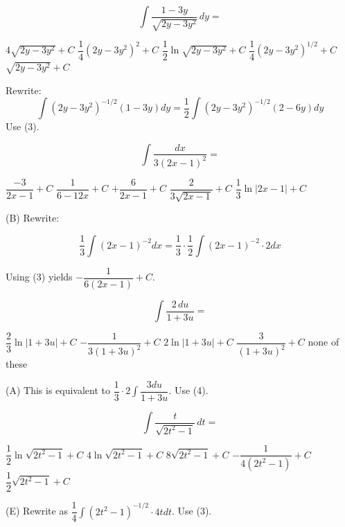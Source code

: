 \question
\[
\displaystyle\int \dfrac{1-3 y}{\sqrt{2 y-3 y^{2}}} \,dy=
\]
\begin{choices}
  \choice $4 \sqrt{2 y-3 y^{2}}+C$
  \choice $\dfrac{1}{4}\left(2 y-3 y^{2}\right)^{2}+C$
  \choice $\dfrac{1}{2} \ln \sqrt{2 y-3 y^{2}}+C$
  \choice $\dfrac{1}{4}\left(2 y-3 y^{2}\right)^{1 / 2}+C$
  \CorrectChoice $\sqrt{2 y-3 y^{2}}+C$
\end{choices}
\begin{solution}
Rewrite:
\[
\displaystyle\int\left(2 y-3 y^{2}\right)^{-1 / 2}(1-3 y) d y=\dfrac{1}{2} \displaystyle\int\left(2 y-3 y^{2}\right)^{-1 / 2}(2-6 y) d y
\]
Use (3).
\end{solution}






\newpage




\question
\[
\displaystyle\int \dfrac{d x}{3(2 x-1)^{2}}=
\]
\begin{choices}
  \choice $\dfrac{-3}{2 x-1}+C$
  \CorrectChoice $\dfrac{1}{6-12 x}+C$
  \choice $+\dfrac{6}{2 x-1}+C$
  \choice $\dfrac{2}{3 \sqrt{2 x-1}}+C$
  \choice $\dfrac{1}{3} \ln |2 x-1|+C$
\end{choices}
\begin{solution}
(B) Rewrite:

\[
\dfrac{1}{3} \displaystyle\int(2 x-1)^{-2} d x=\dfrac{1}{3} \cdot \dfrac{1}{2} \displaystyle\int(2 x-1)^{-2} \cdot 2 d x
\]

Using (3) yields $-\dfrac{1}{6(2 x-1)}+C$.
\end{solution}

\question
\[
\displaystyle\int \dfrac{2 \,du}{1+3 u}=
\]
\begin{choices}
  \CorrectChoice $\dfrac{2}{3} \ln |1+3 u|+C$
  \choice $-\dfrac{1}{3(1+3 u)^{2}}+C$
  \choice $2 \ln |1+3 u|+C$
  \choice $\dfrac{3}{(1+3 u)^{2}}+C$
  \choice none of these
\end{choices}
\begin{solution}
(A) This is equivalent to $\dfrac{1}{3} \cdot 2 \displaystyle\int \dfrac{3 d u}{1+3 u}$. Use (4).
\end{solution}






\newpage




\question
\[
\displaystyle\int \dfrac{t}{\sqrt{2 t^{2}-1}} \,dt=
\]
\begin{choices}
  \choice $\dfrac{1}{2} \ln \sqrt{2 t^{2}-1}+C$
  \choice $4 \ln \sqrt{2 t^{2}-1}+C$
  \choice $8 \sqrt{2 t^{2}-1}+C$
  \choice $-\dfrac{1}{4\left(2 t^{2}-1\right)}+C$
  \CorrectChoice $\dfrac{1}{2} \sqrt{2 t^{2}-1}+C$
\end{choices}
\begin{solution}
(E) Rewrite as $\dfrac{1}{4} \displaystyle\int\left(2 t^{2}-1\right)^{-1 / 2} \cdot 4 t d t$. Use (3).
\end{solution}

